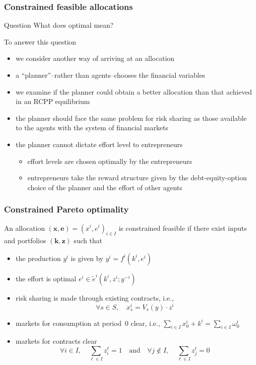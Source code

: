 \documentclass[blue]{beamer}
\def\et{\quad \textrm{and} \quad}
\theoremstyle{definition}
\theoremstyle{example}
\begin{document}

\begin{frame}\frametitle{Constrained feasible allocations}

\begin{block}{Question}
What does optimal mean?
\end{block}
To answer this question
\begin{itemize}
\item we consider another way of arriving at an allocation
\item a ``planner''--rather than agents--chooses the financial variables
\item we examine if the planner could obtain a better allocation than that achieved in an RCPP equilibrium
\item the planner should face the same problem for risk sharing as those available to the agents with the system of financial markets
\item the planner cannot dictate effort level to entrepreneurs
    \begin{itemize}
    \item effort levels are chosen optimally by the entrepreneurs
    \item entrepreneurs take the reward structure given by the debt-equity-option choice of the planner and the effort of other agents
    \end{itemize}
\end{itemize}

\end{frame}


\begin{frame}\frametitle{Constrained Pareto optimality}

\begin{small}
\begin{definition}
An allocation $(\bm{x},\bm{e})=(x^i,e^i)_{i\in I}$ is \alert{constrained feasible} if there exist inputs and portfolios $(\bm{k},\bm{z})$ such that
\begin{itemize}
\item the production $y^i$ is given by $y^i = f^i(k^i,e^i)$
\item the effort is optimal $e^i \in \widetilde{e}^i(k^i,z^i;y^{-i})$
\item risk sharing is made through existing contracts, i.e.,
\[
\forall s\in S, \quad x^i_s = V_s(y) \cdot z^i
\]
\item markets for consumption at period~$0$ clear, i.e., $\sum_{i\in I} x^i_0 + k^i = \sum_{i\in I} \omega^i_0$
\item markets for contracts clear
\[
\forall i\in I, \quad \sum_{\ell\in I} z^\ell_i = 1 \et \forall j\not \in I, \quad \sum_{\ell \in I} z^\ell_j =0
\]
\end{itemize}
\end{definition}
\end{small}

\end{frame}
\end{document}

